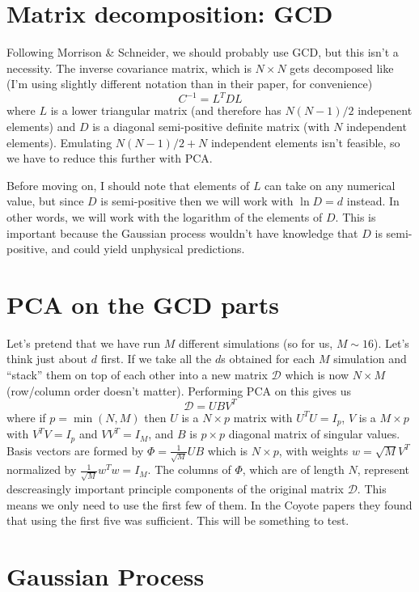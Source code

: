 \documentclass[11pt,twoside,a5paper]{article}
\newcommand{\dc}{\mathcal{D} }
\begin{document}
\section{Matrix decomposition: GCD}
Following Morrison \& Schneider, we should probably use GCD, but this isn't a necessity. The inverse covariance matrix, which is $N\times N$ gets decomposed like (I'm using slightly different notation than in their paper, for convenience)
\begin{equation}
  \label{eq:gcd}
  C^{-1} = L^TDL
\end{equation}
where $L$ is a lower triangular matrix (and therefore has $N(N-1)/2$ indepenent elements) and $D$ is a diagonal semi-positive definite matrix (with $N$ independent elements). Emulating $N(N-1)/2+N$ independent elements isn't feasible, so we have to reduce this further with PCA.

Before moving on, I should note that elements of $L$ can take on any numerical value, but since $D$ is semi-positive then we will work with $\ln D = d$ instead. In other words, we will work with the logarithm of the elements of $D$. This is important because the Gaussian process wouldn't have knowledge that $D$ is semi-positive, and could yield unphysical predictions.

\section{PCA on the GCD parts}
Let's pretend that we have run $M$ different simulations (so for us, $M\sim16$). Let's think just about $d$ first. If we take all the $d$s obtained for each $M$ simulation and ``stack'' them on top of each other into a new matrix $\dc$ which is now $N\times M$ (row/column order doesn't matter). Performing PCA on this gives us
\begin{equation}
  \label{eq:PCA}
  \dc = UBV^T
\end{equation}
where if $p=\min(N,M)$ then $U$ is a $N\times p$ matrix with $U^TU=I_p$, $V$ is a $M\times p$ with $V^TV=I_p$ and $VV^T=I_M$, and $B$ is $p\times p$ diagonal matrix of singular values. Basis vectors are formed by $\Phi = \frac{1}{\sqrt{M}}UB$ which is $N\times p$, with weights $w=\sqrt{M}V^T$ normalized by $\frac{1}{\sqrt{M}}w^Tw=I_M$. The columns of $\Phi$, which are of length $N$, represent descreasingly important principle components of the original matrix $\dc$. This means we only need to use the first few of them. In the Coyote papers they found that using the first five was sufficient. This will be something to test.


\section{Gaussian Process}
\end{document}
